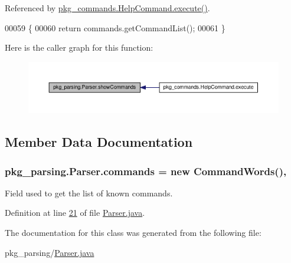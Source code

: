 Referenced by \hyperlink{HelpCommand_8java_source_l00033}{pkg\-\_\-commands.\-Help\-Command.\-execute()}.


\begin{DoxyCode}
00059                                         \{
00060         \textcolor{keywordflow}{return} commands.getCommandList();
00061     \}
\end{DoxyCode}


Here is the caller graph for this function\-:\nopagebreak
\begin{figure}[H]
\begin{center}
\leavevmode
\includegraphics[width=350pt]{classpkg__parsing_1_1Parser_a31545cdbdb409aaeb727289c0ea7be1b_icgraph}
\end{center}
\end{figure}




\subsection{Member Data Documentation}
\hypertarget{classpkg__parsing_1_1Parser_a0e5263205b63cc2c006361a92558132a}{
\subsubsection[{commands}]{ pkg\-\_\-parsing.\-Parser.\-commands = new {\bf Command\-Words}()\hspace{0.3cm}{\ttfamily [static]}, {\ttfamily [private]}}}\label{classpkg__parsing_1_1Parser_a0e5263205b63cc2c006361a92558132a}


Field used to get the list of known commands. 



Definition at line \hyperlink{Parser_8java_source_l00021}{21} of file \hyperlink{Parser_8java_source}{Parser.\-java}.



The documentation for this class was generated from the following file\-:\begin{DoxyCompactItemize}
\item 
pkg\-\_\-parsing/\hyperlink{Parser_8java}{Parser.\-java}\end{DoxyCompactItemize}
